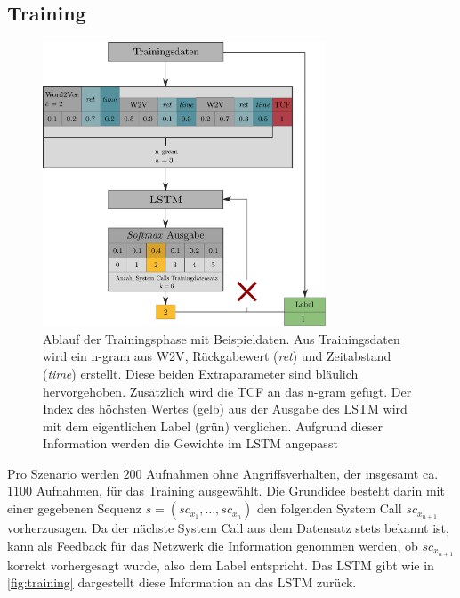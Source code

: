         \subsection{Training}\label{sec:Training}
            \begin{figure}
                \centering
                \includegraphics[width=0.75\textwidth]{images/Process_overview.pdf}
                \caption{Ablauf der Trainingsphase mit Beispieldaten.
                        Aus Trainingsdaten wird ein n-gram aus \ac{W2V}, Rückgabewert (\textit{ret}) und Zeitabstand (\textit{time}) erstellt.
                        Diese beiden Extraparameter sind bläulich hervorgehoben.
                        Zusätzlich wird die \ac{TCF} an das n-gram gefügt.
                        Der Index des höchsten Wertes (gelb) aus der Ausgabe des \ac{LSTM} wird mit dem eigentlichen Label (grün) verglichen.
                        Aufgrund dieser Information werden die Gewichte im \ac{LSTM} angepasst}\label{fig:training}
            \end{figure}
            Pro Szenario werden $200$ Aufnahmen ohne Angriffsverhalten, der insgesamt ca.\ $1100$ Aufnahmen, für das Training ausgewählt.
            Die Grundidee besteht darin mit einer gegebenen Sequenz $s = (sc_{x_1},\dots,sc_{x_n})$ den folgenden System Call $sc_{x_{n+1}}$ vorherzusagen. 
            Da der nächste System Call aus dem Datensatz stets bekannt ist, kann als Feedback für das Netzwerk die Information genommen werden, ob $sc_{x_{n+1}}$ korrekt vorhergesagt wurde, also dem Label entspricht.
            Das \ac{LSTM} gibt wie in \autoref{fig:training} dargestellt diese Information an das \ac{LSTM} zurück.

